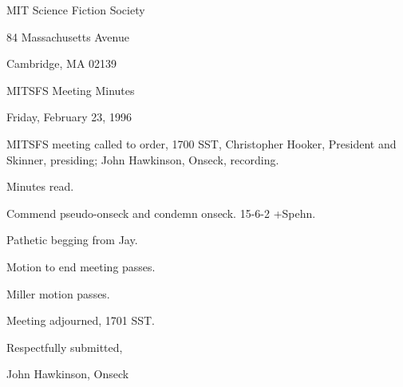 \documentclass[12pt]{article}
\begin{document}
\begin{center}

MIT Science Fiction Society 

84 Massachusetts Avenue

Cambridge, MA 02139

\vspace{12pt}

MITSFS Meeting Minutes 

Friday, February 23, 1996

\end{center}
 
\vspace{18pt}

\setlength{\parskip}{6pt}

\noindent
MITSFS meeting called to order, 1700 SST,
Christopher Hooker, President and Skinner, presiding; John Hawkinson, Onseck, recording.

Minutes read.

Commend pseudo-onseck and condemn onseck. 15-6-2 +Spehn.

Pathetic begging from Jay.

Motion to end meeting passes.

Miller motion passes.

\vspace{12pt}

\noindent
Meeting adjourned, 1701 SST.

\vspace{18pt}

\centerline{Respectfully submitted,}
\centerline{John Hawkinson, Onseck}
\end{document}
